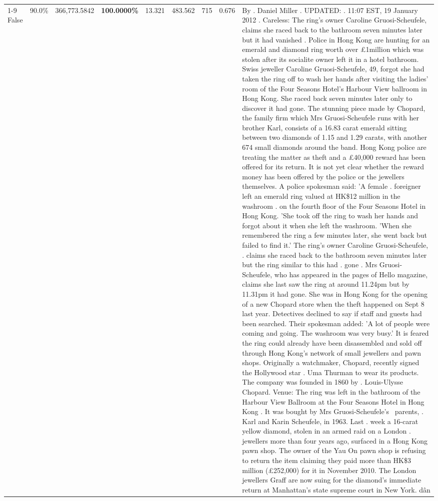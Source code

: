 \begin{table}[H]
\begin{tabular}{lllrlllll}
\cline{1-9}
False & 90.0\% & 366,773.5842 & \bfseries \color{red} 100.0000\% & 13.321 & 483.562 & 715 & 0.676 & By . Daniel Miller . UPDATED: . 11:07 EST, 19 January 2012 . Careless: The ring's owner Caroline Gruosi-Scheufele, claims she raced back to the bathroom seven minutes later but it had vanished . Police in Hong Kong are hunting for an emerald and diamond ring worth over £1million which was stolen after its socialite owner left it in a hotel bathroom. Swiss jeweller Caroline Gruosi-Scheufele, 49, forgot she had taken the ring off to wash her hands after visiting the ladies' room of the Four Seasons Hotel's Harbour View ballroom in Hong Kong. She raced back seven minutes later only to discover it had gone. The stunning piece made by Chopard, the family firm which Mrs Gruosi-Scheufele runs with her brother Karl, consists of a 16.83 carat emerald sitting between two diamonds of 1.15 and 1.29 carats, with another 674 small diamonds around the band. Hong Kong police are treating the matter as theft and a £40,000 reward has been offered for its return. It is not yet clear whether the reward money has been offered by the police or the jewellers themselves. A police spokesman said: 'A female . foreigner left an emerald ring valued at HK\$12 million in the washroom . on the fourth floor of the Four Seasons Hotel in Hong Kong. 'She took off the ring to wash her hands and forgot about it when she left the washroom. 'When she remembered the ring a few minutes later, she went back but failed to find it.' The ring's owner Caroline Gruosi-Scheufele, . claims she raced back to the bathroom seven minutes later but the ring similar to this had . gone . Mrs Gruosi-Scheufele, who has appeared in the pages of Hello magazine, claims she last saw the ring at around 11.24pm but by 11.31pm it had gone. She was in Hong Kong for the opening of a new Chopard store when the theft happened on Sept 8 last year. Detectives declined to say if staff and guests had been searched. Their spokesman added: 'A lot of people were coming and going. The washroom was very busy.' It is feared the ring could already have been disassembled and sold off through Hong Kong's network of small jewellers and pawn shops. Originally a watchmaker, Chopard, recently signed the Hollywood star . Uma Thurman to wear its products. The company was founded in 1860 by . Louis-Ulysse Chopard. Venue: The ring was left in the bathroom of the Harbour View Ballroom at the Four Seasons Hotel in Hong Kong . It was bought by Mrs Gruosi-Scheufele's  parents, . Karl and Karin Scheufele, in 1963. Last . week a 16-carat yellow diamond, stolen in an armed raid on a London . jewellers more than four years ago, surfaced in a Hong Kong pawn shop. The owner of the Yau On pawn shop is refusing to return the item claiming they paid more than HK\$3 million (£252,000) for it in November 2010. The London jewellers Graff are now suing for the diamond’s immediate return at Manhattan’s state supreme court in New York. dân \\

\end{tabular}
\end{table}
